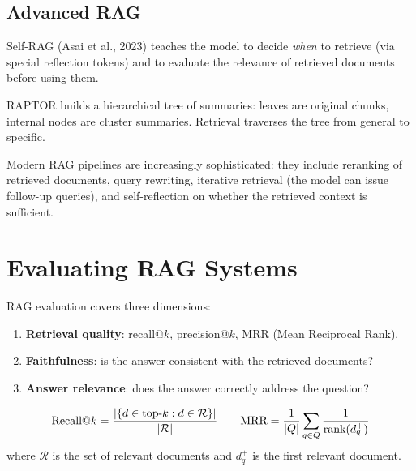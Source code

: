 \subsection{Advanced RAG}

\begin{definition}
Self-RAG (Asai et al., 2023) teaches the model to decide \emph{when}
to retrieve (via special reflection tokens) and to evaluate the
relevance of retrieved documents before using them.
\end{definition}

\begin{definition}[RAPTOR]
RAPTOR builds a hierarchical tree of summaries: leaves are original
chunks, internal nodes are cluster summaries. Retrieval traverses the
tree from general to specific.
\end{definition}

\begin{intuition}
Modern RAG pipelines are increasingly sophisticated: they include
reranking of retrieved documents, query rewriting, iterative retrieval
(the model can issue follow-up queries), and self-reflection on whether
the retrieved context is sufficient.
\end{intuition}

\section{Evaluating RAG Systems}
\label{sec:rag:eval}

\begin{definition}
RAG evaluation covers three dimensions:
\begin{enumerate}
    \item \textbf{Retrieval quality}: recall@$k$, precision@$k$, MRR
    (Mean Reciprocal Rank).
    \item \textbf{Faithfulness}: is the answer consistent with the
    retrieved documents?
    \item \textbf{Answer relevance}: does the answer correctly address
    the question?
\end{enumerate}
\end{definition}

\begin{keyformulas}[title=\textbf{Recall@$k$ and MRR}]
\[
    \text{Recall@}k = \frac{\left| \{d \in \text{top-}k : d \in \mathcal{R}\} \right|}
    {\left| \mathcal{R} \right|}
    \qquad
    \text{MRR} = \frac{1}{\left| Q \right|} \sum_{q \in Q} \frac{1}{\text{rank}(d_q^+)}
\]
where $\mathcal{R}$ is the set of relevant documents and $d_q^+$ is the
first relevant document.
\end{keyformulas}

